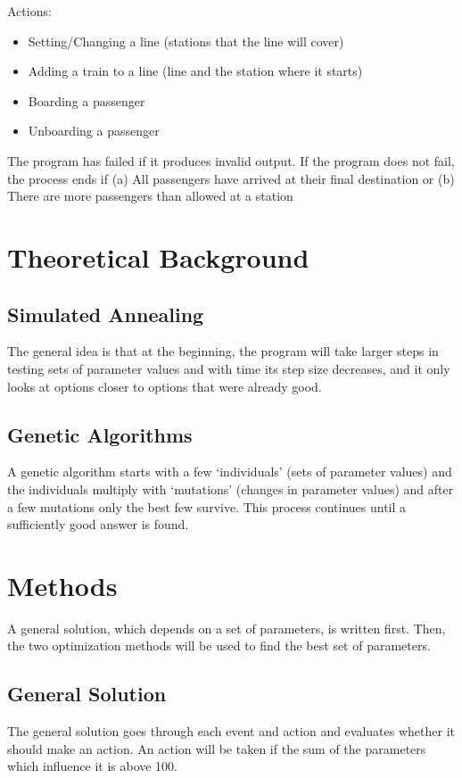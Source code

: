 \documentclass[10pt]{report}
\begin{document}
Actions:
\begin{itemize}
    \item Setting/Changing a line (stations that the line will cover)
    \item Adding a train to a line (line and the station where it starts)
    \item Boarding a passenger
    \item Unboarding a passenger
\end{itemize}

The program has failed if it produces invalid output. If the program does not fail, the process ends if
(a)	All passengers have arrived at their final destination
or
(b)	There are more passengers than allowed at a station


\chapter{Theoretical Background}

\section{Simulated Annealing}
The general idea is that at the beginning, the program will take larger steps in testing sets of parameter values and with time its step size decreases, and it only looks at options closer to options that were already good.

\section{Genetic Algorithms}
A genetic algorithm starts with a few ‘individuals’ (sets of parameter values) and the individuals multiply with ‘mutations’ (changes in parameter values) and after a few mutations only the best few survive. This process continues until a sufficiently good answer is found.


\chapter{Methods}

A general solution, which depends on a set of parameters, is written first. Then, the two optimization methods will be used to find the best set of parameters.


\section{General Solution}
The general solution goes through each event and action and evaluates whether it should make an action. An action will be taken if the sum of the parameters which influence it is above 100.
\end{document}
